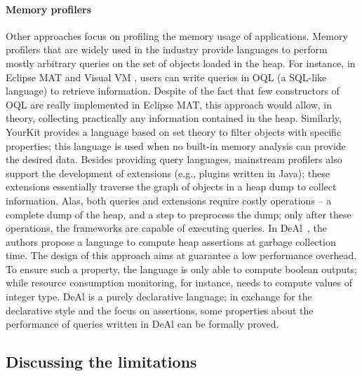 \paragraph{Memory profilers}
Other approaches focus on profiling the memory usage of applications.
Memory profilers that are widely used in the industry provide languages to perform mostly arbitrary queries on the set of objects loaded in the heap.
For instance, in Eclipse MAT \cite{Biermann:2006:GDI:2087202.2087244} and Visual VM \cite{OQL-visualvm}, users can write queries in OQL (a SQL-like language) to retrieve information.
Despite of the fact that few constructors of OQL are really implemented in Eclipse MAT, this approach would allow, in theory, collecting practically any information contained in the heap.
Similarly, YourKit \cite{yourkit} provides a language based on set theory to filter objects with specific properties; this language is used when no built-in memory analysis can provide the desired data.
Besides providing query languages, mainstream profilers also support the development of extensions (e.g., plugins written in Java); these extensions essentially traverse the graph of objects in a heap dump to collect information.
Alas, both queries and extensions require costly operations -- a complete dump of the heap, and a step to preprocess the dump; only after these operations, the frameworks are capable of executing queries.
In DeAl~\cite{Reichenbach:2010:GCE:1869459.1869482}, the authors propose a language to compute heap assertions at garbage collection time.
The design of this approach aims at guarantee a low performance overhead.
To ensure such a property, the language is only able to compute boolean outputs; while resource consumption monitoring, for instance, needs to compute values of integer type.
DeAl is a purely declarative language; in exchange for the declarative style and the focus on assertions, some properties about the performance of queries written in DeAl can be formally proved. 

\subsection{Discussing the limitations} \label{sec:discussing-tools-to-ease-construction}

